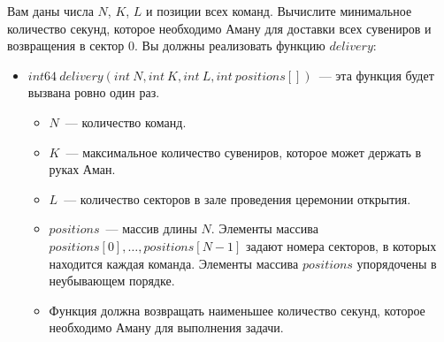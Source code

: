 Вам даны числа $N$, $K$, $L$ и позиции всех команд. Вычислите минимальное количество секунд,
которое необходимо Аману для доставки всех сувениров и возвращения в сектор $0$. Вы
должны реализовать функцию $delivery$:
\begin{itemize}
\item $int64\ delivery(int\ N, int\ K, int\ L, int\ positions[])$~--- эта функция будет вызвана ровно один раз.
\begin{itemize}
\item $N$~--- количество команд.
\item $K$~--- максимальное количество сувениров, которое может держать в руках Аман.
\item $L$~--- количество секторов в зале проведения церемонии открытия.
\item $positions$~--- массив длины $N$. Элементы массива $positions[0], \ldots, positions[N - 1]$ задают номера секторов, в которых находится каждая команда.
Элементы массива $positions$ упорядочены в неубывающем порядке.
\item Функция должна возвращать наименьшее количество секунд, которое необходимо
Аману для выполнения задачи.
\end{itemize}
\end{itemize}

